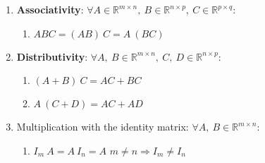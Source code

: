 \begin{enumerate}[itemsep=0.2cm]
    \item \textbf{Associativity}: 
    $
        \forall 
        A\in \mathbb{R}^{m\times n},\ 
        B\in \mathbb{R}^{n\times p},\ 
        C \in \mathbb{R}^{p\times q}
    $:
    
        \begin{enumerate}
            \item $ABC = (AB)\ C = A\ (BC)$
            \hfill \cite{mfml/book/mml/Deisenroth-Faisal-Ong}
        \end{enumerate}

    \item \textbf{Distributivity}: 
    $
        \forall 
        A,\ B\in \mathbb{R}^{m\times n},\ 
        C,\ D\in \mathbb{R}^{n\times p}
    $:

        \begin{enumerate}
            \item $(A + B)\ C = AC + BC$
            \hfill \cite{mfml/book/mml/Deisenroth-Faisal-Ong}
            
            \item $A\ (C + D) = AC + AD$
            \hfill \cite{mfml/book/mml/Deisenroth-Faisal-Ong}
        \end{enumerate}

    \item Multiplication with the identity matrix: 
    $
        \forall 
        A,\ B\in \mathbb{R}^{m\times n}
    $:
        \begin{enumerate}
            \item $I_m\ A = A\ I_n = A$
            \hfill $m\neq n \Rightarrow I_m \neq I_n$
            \hfill \cite{mfml/book/mml/Deisenroth-Faisal-Ong}

            
        \end{enumerate}
\end{enumerate}










